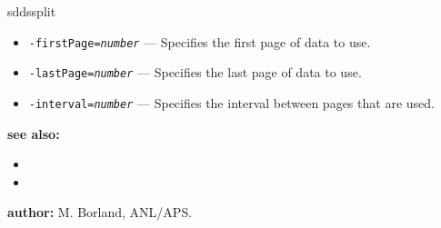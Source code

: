 \begin{sddsprog}{sddssplit}
\begin{itemize}
      \item {\tt -firstPage=\emph{number}} --- Specifies the first page of data to use.
      \item {\tt -lastPage=\emph{number}} --- Specifies the last page of data to use.
      \item {\tt -interval=\emph{number}} --- Specifies the interval between pages that are used.
    \end{itemize}
  \item \textbf{see also:}
    \begin{itemize}
      \item {}
      \item {}
    \end{itemize}
  \item \textbf{author:} M. Borland, ANL/APS.
\end{sddsprog}
